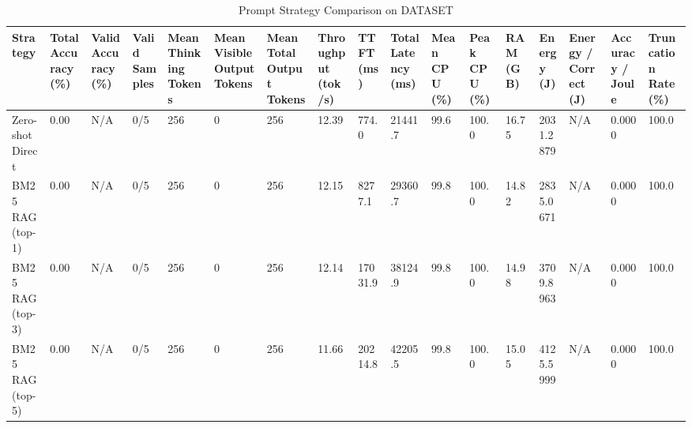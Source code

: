 \begin{table}
\caption{Prompt Strategy Comparison on DATASET}
\label{tab:strategy_comparison}
\begin{tabular}{lllllllllllllllll}
\toprule
Strategy & Total Accuracy (\%) & Valid Accuracy (\%) & Valid Samples & Mean Thinking Tokens & Mean Visible Output Tokens & Mean Total Output Tokens & Throughput (tok/s) & TTFT (ms) & Total Latency (ms) & Mean CPU (\%) & Peak CPU (\%) & RAM (GB) & Energy (J) & Energy / Correct (J) & Accuracy / Joule & Truncation Rate (\%) \\
\midrule
Zero-shot Direct & 0.00 & N/A & 0/5 & 256 & 0 & 256 & 12.39 & 774.0 & 21441.7 & 99.6 & 100.0 & 16.75 & 2031.2879 & N/A & 0.0000 & 100.0 \\
BM25 RAG (top-1) & 0.00 & N/A & 0/5 & 256 & 0 & 256 & 12.15 & 8277.1 & 29360.7 & 99.8 & 100.0 & 14.82 & 2835.0671 & N/A & 0.0000 & 100.0 \\
BM25 RAG (top-3) & 0.00 & N/A & 0/5 & 256 & 0 & 256 & 12.14 & 17031.9 & 38124.9 & 99.8 & 100.0 & 14.98 & 3709.8963 & N/A & 0.0000 & 100.0 \\
BM25 RAG (top-5) & 0.00 & N/A & 0/5 & 256 & 0 & 256 & 11.66 & 20214.8 & 42205.5 & 99.8 & 100.0 & 15.05 & 4125.5999 & N/A & 0.0000 & 100.0 \\
\bottomrule
\end{tabular}
\end{table}
